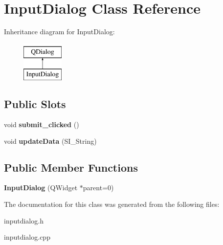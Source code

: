 \hypertarget{class_input_dialog}{}\section{Input\+Dialog Class Reference}
\label{class_input_dialog}
Inheritance diagram for Input\+Dialog\+:\begin{figure}[H]
\begin{center}
\leavevmode
\includegraphics[height=2.000000cm]{class_input_dialog}
\end{center}
\end{figure}
\subsection*{Public Slots}
\begin{DoxyCompactItemize}
\item 
\mbox{\label{class_input_dialog_a9350aaf68e3c3d3879ffa92b0a0abeca}} 
void {\bfseries submit\+\_\+clicked} ()
\item 
\mbox{\label{class_input_dialog_a6cc8e60359a166d15c48a6e7543c72fc}} 
void {\bfseries update\+Data} (S\+I\+\_\+\+String)
\end{DoxyCompactItemize}
\subsection*{Public Member Functions}
\begin{DoxyCompactItemize}
\item 
\mbox{\label{class_input_dialog_a348ae820e563de9aed5077a2bbaf15b5}} 
{\bfseries Input\+Dialog} (Q\+Widget $\ast$parent=0)
\end{DoxyCompactItemize}


The documentation for this class was generated from the following files\+:\begin{DoxyCompactItemize}
\item 
inputdialog.\+h\item 
inputdialog.\+cpp\end{DoxyCompactItemize}
